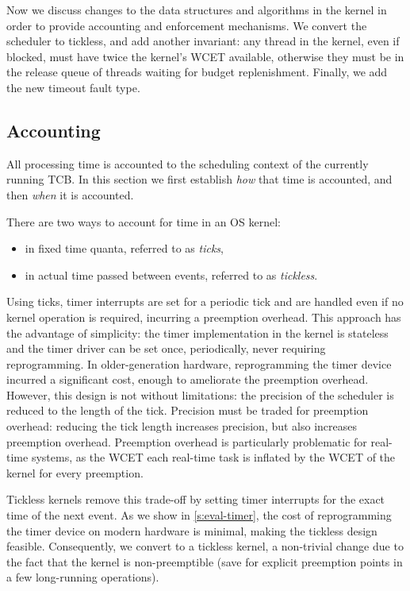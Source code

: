Now we discuss changes to the data structures and algorithms in the kernel in order to provide
accounting and enforcement mechanisms. We convert the scheduler to tickless, and add another
invariant: any thread in the kernel, even if blocked, must have twice the kernel's WCET available,
otherwise they must be in the release queue of threads waiting for budget replenishment. Finally, we
add the new timeout fault type.

\subsection{Accounting}

All processing time is accounted to the scheduling context of the currently running \gls{TCB}. 
In this section we first establish \emph{how} that time is accounted, and then \emph{when} it is
accounted.

There are two ways to account for time in an \gls{OS} kernel:
\begin{itemize}
    \item in fixed time quanta, referred to as \emph{ticks},
    \item in actual time passed between events, referred to as \emph{tickless}.
\end{itemize}

Using ticks, timer interrupts are set for a periodic tick and are
handled even if no kernel operation is required, incurring a preemption overhead.
This approach has the advantage of simplicity: the timer implementation in the kernel is 
stateless and the timer driver can be set once, periodically, never requiring reprogramming. 
In older-generation hardware, reprogramming the timer device incurred a significant cost, enough to
ameliorate the preemption overhead. However, this design is not without limitations:
the precision of the scheduler is reduced to the length of the tick. Precision must be traded for
preemption overhead: reducing the tick length increases precision, but also increases 
preemption overhead. Preemption overhead is particularly problematic for real-time systems, as
the \gls{WCET} each real-time task is inflated by the \gls{WCET} of the kernel for every preemption.

Tickless kernels remove this trade-off by setting timer interrupts for the exact time of the next
event. As we show in \cref{s:eval-timer}, the cost of reprogramming the timer device on modern
hardware is minimal, making the tickless design feasible. Consequently, we convert \selfour
to a tickless kernel, a non-trivial change due to the fact that the kernel is non-preemptible (save for
explicit preemption points in a few long-running operations). 

